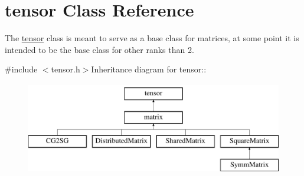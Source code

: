 \hypertarget{classJKBuilder_1_1tensor}{
\section{tensor Class Reference}
\label{classJKBuilder_1_1tensor}
}


The \hyperlink{classJKBuilder_1_1tensor}{tensor} class is meant to serve as a base class for matrices, at some point it is intended to be the base class for other ranks than 2.  


{\ttfamily \#include $<$tensor.h$>$}Inheritance diagram for tensor::\begin{figure}[H]
\begin{center}
\leavevmode
\includegraphics[height=4cm]{classJKBuilder_1_1tensor}
\end{center}
\end{figure}
